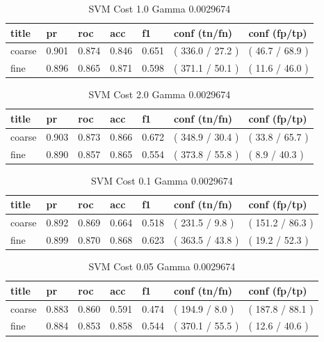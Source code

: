 \documentclass[ms]{nuthesis}
\begin{document}
\FloatBarrier
\begin{table}[H]
\centering
\caption{SVM Cost 1.0 Gamma 0.0029674}
\label{tab:SVM-C1-Gp0029674}
\begin{tabular}{|l||l||l||l||l||l||l|}\toprule
title & pr & roc & acc & f1 & conf (tn/fn) & conf (fp/tp) \\ \midrule
coarse & 0.901 & 0.874 & 0.846 & 0.651 & ( 336.0 / 27.2 ) & ( 46.7 / 68.9 ) \\
fine & 0.896 & 0.865 & 0.871 & 0.598 & ( 371.1 / 50.1 ) & ( 11.6 / 46.0 ) \\ \bottomrule
\end{tabular}
\end{table}
\FloatBarrier


\FloatBarrier
\begin{table}[H]
\centering
\caption{SVM Cost 2.0 Gamma 0.0029674}
\label{tab:SVM-C2-Gp0029674}
\begin{tabular}{|l||l||l||l||l||l||l|}\toprule
title & pr & roc & acc & f1 & conf (tn/fn) & conf (fp/tp) \\ \midrule
coarse & 0.903 & 0.873 & 0.866 & 0.672 & ( 348.9 / 30.4 ) & ( 33.8 / 65.7 ) \\
fine & 0.890 & 0.857 & 0.865 & 0.554 & ( 373.8 / 55.8 ) & ( 8.9 / 40.3 ) \\ \bottomrule
\end{tabular}
\end{table}
\FloatBarrier



\FloatBarrier
\begin{table}[H]
\centering
\caption{SVM Cost 0.1 Gamma 0.0029674}
\label{tab:SVM-Cp1-Gp0029674}
\begin{tabular}{|l||l||l||l||l||l||l|}\toprule
title & pr & roc & acc & f1 & conf (tn/fn) & conf (fp/tp) \\ \midrule
coarse & 0.892 & 0.869 & 0.664 & 0.518 & ( 231.5 / 9.8 ) & ( 151.2 / 86.3 ) \\
fine & 0.899 & 0.870 & 0.868 & 0.623 & ( 363.5 / 43.8 ) & ( 19.2 / 52.3 ) \\ \bottomrule
\end{tabular}
\end{table}
\FloatBarrier


\FloatBarrier
\begin{table}[H]
\centering
\caption{SVM Cost 0.05 Gamma 0.0029674}
\label{tab:SVM-Cp05-Gp0029674}
\begin{tabular}{|l||l||l||l||l||l||l|}\toprule
title & pr & roc & acc & f1 & conf (tn/fn) & conf (fp/tp) \\ \midrule
coarse & 0.883 & 0.860 & 0.591 & 0.474 & ( 194.9 / 8.0 ) & ( 187.8 / 88.1 ) \\
fine & 0.884 & 0.853 & 0.858 & 0.544 & ( 370.1 / 55.5 ) & ( 12.6 / 40.6 ) \\ \bottomrule
\end{tabular}
\end{table}
\FloatBarrier
\end{document}
